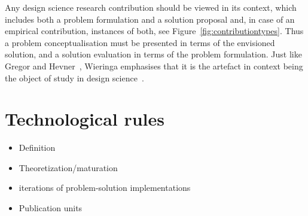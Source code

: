 \documentclass[graybox]{svmult}
\begin{document}
Any design science research contribution should be viewed in its context, which includes both a problem formulation and a solution proposal and, in case of an empirical contribution, instances of both, see Figure~\ref{fig:contributiontypes}. Thus a problem conceptualisation must be presented in terms of the envisioned solution, and a solution evaluation in terms of the problem formulation. 
Just like Gregor and Hevner~\cite{gregor_positioning_2013}, Wieringa emphasises that it is the artefact in context being the object of study in design science~\cite{wieringa_design_2009}.

\section{Technological rules}
\begin{itemize}
\item Definition
\item Theoretization/maturation
\item iterations of problem-solution implementations
\item Publication units
\end{itemize}







\end{document}
